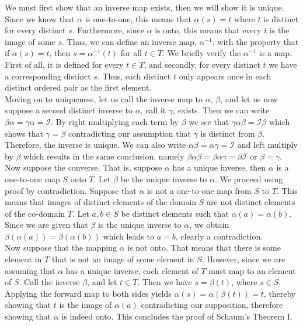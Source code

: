 We must first show that an inverse map exists, then we will show it is unique.\\

Since we know that $\alpha$ is one-to-one, this means that $\alpha(s)=t$ where $t$ is distinct for every distinct $s$.  Furthermore, since $\alpha$ is onto, this means that every $t$ is the image of some $s$.  Thus, we can define an inverse map, $\alpha^{-1}$, with the property that if $\alpha(s)=t$, then $s=\alpha^{-1}(t)$ for all $t \in T$.  We briefly verify the $\alpha^{-1}$ is a map.  First of all, it is defined for every $t \in T$, and secondly, for every distinct $t$ we have a corresponding distinct $s$.  Thus, each distinct $t$ only appears once in each distinct ordered pair as the first element.\\

Moving on to uniqueness, let us call the inverse map to $\alpha$, $\beta$, and let us now suppose a second distinct inverse to $\alpha$, call it $\gamma$, exists.  Then we can write $\beta \alpha = \gamma \alpha = \mathcal{I}$.  By right multiplying each term by $\beta$ we see that $\gamma \alpha \beta = \mathcal{I} \beta$ which shows that $\gamma = \beta$ contradicting our assumption that $\gamma$ is distinct from $\beta$.  Therefore, the inverse is unique.  We can also write  $\alpha \beta = \alpha \gamma = \mathcal{I}$ and left multiply by $\beta$ which results in the same conclusion, namely $\beta \alpha \beta = \beta \alpha \gamma = \beta \mathcal{I}$ or $ \beta = \gamma$.\\

Now suppose the converse.  That is, suppose $\alpha$ has a unique inverse, then $\alpha$ is a one-to-one map $S$ onto $T$.  Let $\beta$ be the unique inverse to $\alpha$.  We proceed using proof by contradiction.  Suppose that $\alpha$ is not a one-to-one map from $S$ to $T$.  This means that images of distinct elements of the domain $S$ are not distinct elements of the co-domain $T$.  Let $a, b \in S$ be distinct elements such that $\alpha(a)=\alpha(b)$.  Since we are given that $\beta$ is the unique inverse to $\alpha$, we obtain $\beta ( \alpha(a))= \beta (\alpha(b))$ which leads to $a=b$, clearly a contradiction.\\  

Now suppose that the mapping $\alpha$ is not onto.  That means that there is some element in $T$ that is not an image of some element in $S$.  However, since we are assuming that $\alpha$ has a unique inverse, each element of $T$ must map to an element of $S$.  Call the inverse $\beta$, and let $t \in T$.  Then we have $s = \beta(t)$, where $s \in S$.  Applying the forward map to both sides yields $\alpha(s)= \alpha ( \beta(t))=t$, thereby showing that $t$ is the image of $\alpha(a)$ contradicting our supposition, therefore showing that $\alpha$ is indeed onto.  This concludes the proof of Schaum's Theorem I.\\

